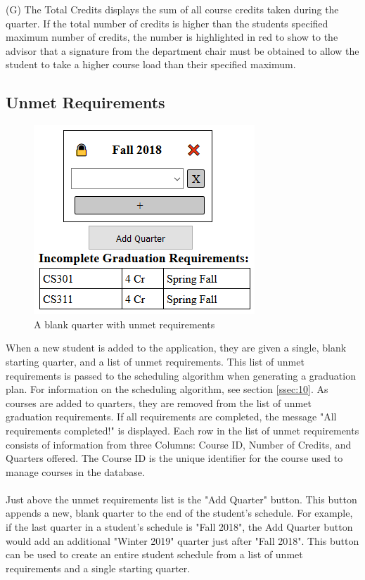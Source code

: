 \documentclass[]{article}
\begin{document}
		(G) The Total Credits displays the sum of all course credits taken during the quarter. If the total number of credits is higher than the students specified maximum number of credits, the number is highlighted in red to show to the advisor that a signature from the department chair must be obtained to allow the student to take a higher course load than their specified maximum.
	\subsection{Unmet Requirements}\label{ssec:17}
		\begin{figure}[H]
			\caption{A blank quarter with unmet requirements}
			\label{unmetrequirements}
			\centering
			\includegraphics{unmetrequirements.PNG}
		\end{figure}
		
		When a new student is added to the application, they are given a single, blank starting quarter, and a list of unmet requirements. This list of unmet requirements is passed to the scheduling algorithm when generating a graduation plan. For information on the scheduling algorithm, see section \ref{ssec:10}. As courses are added to quarters, they are removed from the list of unmet graduation requirements. If all requirements are completed, the message "All requirements completed!" is displayed. Each row in the list of unmet requirements consists of information from three Columns: Course ID, Number of Credits, and Quarters offered. The Course ID is the unique identifier for the course used to manage courses in the database. \\~\\

		Just above the unmet requirements list is the "Add Quarter" button. This button appends a new, blank quarter to the end of the student's schedule. For example, if the last quarter in a student's schedule is "Fall 2018", the Add Quarter button would add an additional "Winter 2019" quarter just after "Fall 2018". This button can be used to create an entire student schedule from a list of unmet requirements and a single starting quarter.
\end{document}
